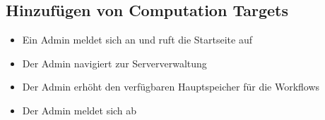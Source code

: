 \subsection*{Hinzufügen von Computation Targets}
\begin{itemize}
    \item Ein \Gls{Admin} meldet sich an und ruft die Startseite auf
    \item Der \Gls{Admin} navigiert zur Serververwaltung
    \item Der \gls{Admin} erhöht den verfügbaren Hauptspeicher für die Workflows
    \item Der \gls{Admin} meldet sich ab
\end{itemize}
